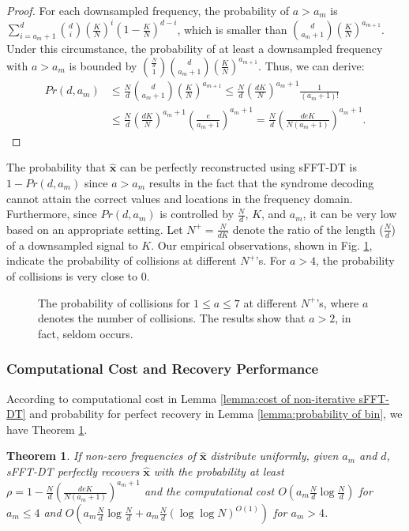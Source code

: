 \documentclass[journal,onecolumn,11pt]{IEEEtran}
\newtheorem{theorem}{Theorem}
\begin{document}
\begin{proof}
For each downsampled frequency, the probability of $a > a_{m}$ is ${ \sum_{i=a_{m}+1}^{d} \binom{d}{i} (\frac{K}{N})^{i} (1-\frac{K}{N})^{d-i}} $, which is smaller than $\binom{d}{a_{m}+1} (\frac{K}{N})^{a_{m+1}}$.
Under this circumstance, the probability of at least a downsampled frequency with $a > a_{m}$ is  bounded  by $\binom{\frac{N}{d}}{1} \binom{d}{a_{m}+1} (\frac{K}{N})^{a_{m+1}}$.
Thus, we can derive:
\small
\begin{equation}
\begin{aligned}
Pr(d,a_{m}) &\leq \frac{N}{d} \binom{d}{a_{m}+1} (\frac{K}{N})^{a_{m+1}}\leq \frac{N}{d} (\frac{dK}{N})^{a_{m}+1}  \frac{1}{(a_{m}+1)!} \\
&\leq \frac{N}{d} (\frac{dK}{N})^{a_{m}+1}  (\frac{e}{a_{m}+1})^{a_{m}+1} = \frac{N}{d} (\frac{deK}{N(a_{m}+1)})^{a_{m}+1}.
\end{aligned}
\label{Eq: lemma:probability of bin}
\end{equation}
\end{proof}
\normalsize
The probability that $\bm{\hat{x}}$ can be perfectly reconstructed using sFFT-DT is $1-Pr(d,a_{m})$ since $a > a_{m}$ results in the fact that the syndrome decoding cannot attain the correct values and locations in the frequency domain.
Furthermore, since $Pr(d,a_{m})$ is controlled by $\frac{N}{d}$, $K$, and $a_{m}$, it can be very low based on an appropriate setting.
Let $\displaystyle N^{+}=\frac{N}{dK}$ denote the ratio of the length ($\displaystyle \frac{N}{d}$) of a downsampled signal to $K$.
Our empirical observations, shown in Fig. \ref{fig:aliasing}, indicate the probability of collisions at different $N^{+}$'s.
For $a>4$, the probability of collisions is very close to $0$.
\begin{figure}[h]
\hfill
\caption{The probability of collisions for $1\leq a\leq 7$ at different $N^{+}$'s, where $a$ denotes the number of collisions. The results show that $a > 2$, in fact, seldom occurs.}
\label{fig:aliasing}
\end{figure}


\subsubsection{Computational Cost and Recovery Performance}
According to computational cost in Lemma \ref{lemma:cost of non-iterative sFFT-DT} and probability for perfect recovery in Lemma \ref{lemma:probability of bin}, we have Theorem \ref{theorem:probability of sfftdt v1}.
\begin{theorem}
\label{theorem:probability of sfftdt v1}
If non-zero frequencies of $\bm{\hat{x}}$ distribute uniformly, given $a_{m}$ and $d$, sFFT-DT perfectly recovers $\bm{\hat{x}}$ with the probability at least $\rho = 1-\frac{N}{d} (\frac{deK}{N(a_{m}+1)})^{a_{m}+1}$ and the computational cost $O(a_{m}\frac{N}{d}\log \frac{N}{d})$ for $a_{m}\leq 4$ and $O(a_{m}\frac{N}{d}\log \frac{N}{d}+a_{m}\frac{N}{d}(\log \log N)^{O(1)})$ for $a_{m} > 4$.
\end{theorem}
\end{document}
